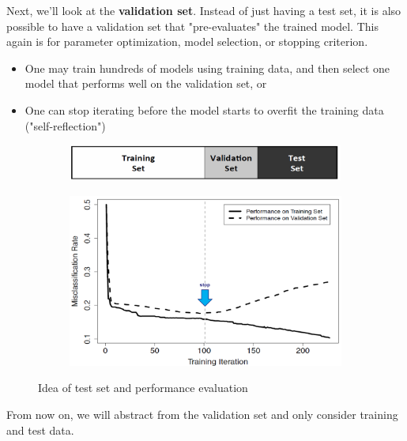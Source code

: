 Next, we'll look at the \textbf{validation set}. Instead of just having a test set, it is also possible to have a validation set that "pre-evaluates" the trained model. This again is for parameter optimization, model selection, or stopping criterion.
\begin{itemize}
  \item One may train hundreds of models using training data, and then select one model that performs well on the validation set, or
  \item One can stop iterating before the model starts to overfit the training data ("self-reflection")
\end{itemize}

\begin{figure}[H]
  \centering
  \begin{subfigure}{0.45\textwidth}
    \centering
    \includegraphics[width=\textwidth]{assets/sl/basic__data_split.png}
  \end{subfigure}
  \hspace*{0.05\textwidth}
  \begin{subfigure}{0.45\textwidth}
    \centering
    \includegraphics[width=\textwidth]{assets/sl/basic__validation_set_cutoff.png}
  \end{subfigure}

  \caption{Idea of test set and performance evaluation}
  \label{fig:7_validation_set_split}
\end{figure}

From now on, we will abstract from the validation set and only consider training and test data.

